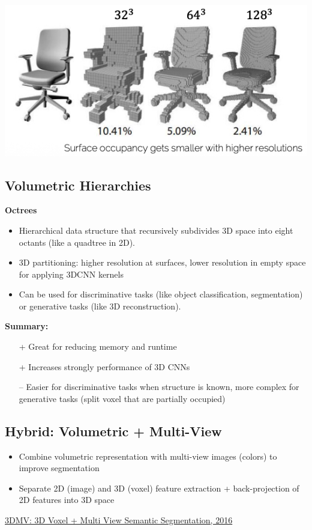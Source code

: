 \begin{center}
    \includegraphics[width=0.65\columnwidth]{images/3D_voxel_memory.jpeg}
    \label{fig:3D_voxel_memory}
\end{center}


\subsection{Volumetric Hierarchies}
\textbf{Octrees}
\begin{itemize}
    \item Hierarchical data structure that recursively subdivides 3D space into eight octants (like a quadtree in 2D).
    \item 3D partitioning: higher resolution at surfaces, lower resolution in empty space for applying 3DCNN kernels
    \item Can be used for discriminative tasks (like object classification, segmentation) or generative tasks (like 3D reconstruction).
\end{itemize}


\textbf{Summary:}
\begin{itemize}[label={}] %
    \item[+] Great for reducing memory and runtime
    \item[+] Increases strongly performance of 3D CNNs
    \item[--] Easier for discriminative tasks when structure is known, more complex for generative tasks (split voxel that are partially occupied)
\end{itemize}


\subsection{Hybrid: Volumetric + Multi-View}
\begin{itemize}
    \item Combine volumetric representation with multi-view images (colors) to improve segmentation
    \item Separate 2D (image) and 3D (voxel) feature extraction + back-projection of 2D features into 3D space
\end{itemize}
\href{https://arxiv.org/pdf/1803.10409}{3DMV: 3D Voxel + Multi View Semantic Segmentation, 2016}

